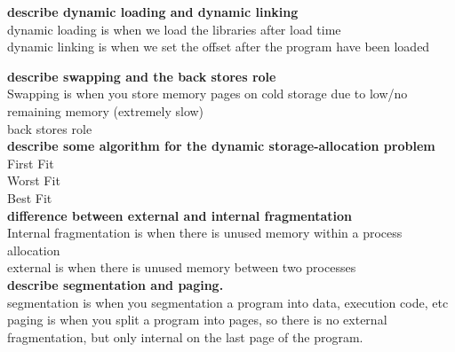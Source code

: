 \documentclass[a4paper,10pt,titlepage]{report}
\begin{document}
\vspace{5mm}

\textbf{describe dynamic loading and dynamic linking} \\
\hspace{10mm}dynamic loading is when we load the libraries after load time\\
\hspace{10mm}dynamic linking is when we set the offset after the program have been loaded \\ 
\vspace{5mm}

\textbf{describe swapping and the back stores role} \\
\hspace{10mm} Swapping is when you store memory pages on cold storage due to low/no remaining memory (extremely slow)\\
\hspace{10mm} back stores role \\


\vspace{5mm}
\textbf{describe some algorithm for the dynamic storage-allocation problem} \\
\hspace{10mm} First Fit \\
\hspace{10mm} Worst Fit \\
\hspace{10mm} Best Fit \\

\vspace{5mm}
\textbf{difference between external and internal fragmentation}\\
\hspace{10mm} Internal fragmentation is when there is unused memory within a process allocation \\
\hspace{10mm} external is when there is unused memory between two processes \\

\vspace{5mm}
\textbf{describe segmentation and paging.}\\
\hspace{10mm} segmentation is when you segmentation a program into data, execution code, etc  \\
\hspace{10mm} paging is when you split a program into pages, so there is no external fragmentation, but only internal on the last page of the program.\\
\end{document}
